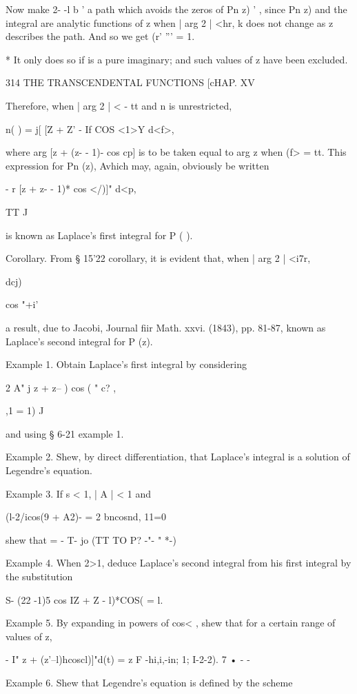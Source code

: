 {{Now make 2- -l b ' a path which avoids the zeros of Pn z) ' , since Pn
z) and the integral are analytic functions of z when | arg 2 | <hr, k
does not change as z describes the path. And so we get (r' ''' = 1.

* It only does so if is a pure imaginary; and such values of z have
been excluded.

314 THE TRANSCENDENTAL FUNCTIONS [cHAP. XV

Therefore, when | arg 2 | < - tt and n is unrestricted,

 n( ) = j[ [Z + Z' - If COS <1>Y d<f>,

where arg [z + (z- - 1)- cos cp] is to be taken equal to arg z when
(f> = tt. This expression for Pn (z), Avhich may, again, obviously be
written

- r [z + z- - 1)* cos </)]" d<p,

TT J

is known as Laplace's first integral for P ( ).

Corollary. From § 15'22 corollary, it is evident that, when | arg 2 |
<i7r,

dcj)

 cos "+i'

a result, due to Jacobi, Journal fiir Math. xxvi. (1843), pp. 81-87,
known as Laplace's second integral for P (z).

Example 1. Obtain Laplace's first integral by considering

2 A" j z + z-- ) cos ( " c? ,

,1 = 1) J

and using § 6-21 example 1.

Example 2. Shew, by direct differentiation, that Laplace's integral is
a solution of Legendre's equation.

Example 3. If s < 1, | A | < 1 and

(l-2/icos(9 + A2)- = 2 bncosnd, 11=0

shew that = - T- jo (TT TO P? -"- " *-)

Example 4. When 2>1, deduce Laplace's second integral from his first
integral by the substitution

 S- (22 -1)5 cos IZ + Z - l)*COS( = l.

Example 5. By expanding in powers of cos< , shew that for a certain
range of values of z,

- I" z + (z'--l)hcoscl)]"d(t) = z F -hi,i,-in; 1; I-2-2). 7 • - -

Example 6. Shew that Legendre's equation is defined by the scheme

}}
